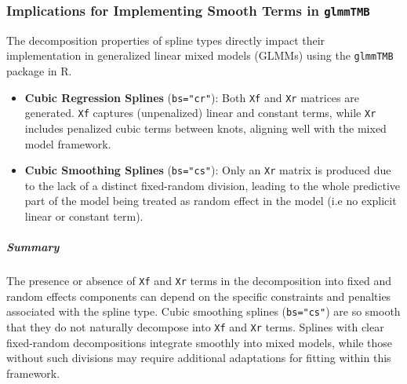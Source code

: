\documentclass[12pt, twoside,hidelinks]{article}
\theoremstyle{definition}
\numberwithin{equation}{section}
\begin{document}
\subsubsection{Implications for Implementing Smooth Terms in \texttt{glmmTMB}}

The decomposition properties of spline types directly impact their implementation in generalized linear mixed models (GLMMs) using the \texttt{glmmTMB} package in R.

\begin{itemize}
    \item \textbf{Cubic Regression Splines} (\texttt{bs="cr"}): Both \texttt{Xf} and \texttt{Xr} matrices are generated. \texttt{Xf} captures (unpenalized) linear and constant terms, while \texttt{Xr} includes penalized cubic terms between knots, aligning well with the mixed model framework.
    \item \textbf{Cubic Smoothing Splines} (\texttt{bs="cs"}): Only an \texttt{Xr} matrix is produced due to the lack of a distinct fixed-random division, leading to the whole predictive part of the model being treated as random effect in the model (i.e no explicit linear or constant term).
\end{itemize}

\subparagraph{Summary}

The presence or absence of \texttt{Xf} and \texttt{Xr} terms in the decomposition into fixed and random effects components can depend on the specific constraints and penalties associated with the spline type. Cubic smoothing splines (\texttt{bs="cs"}) are so smooth that they do not naturally decompose into \texttt{Xf} and \texttt{Xr} terms. Splines with clear fixed-random decompositions integrate smoothly into mixed models, while those without such divisions may require additional adaptations for fitting within this framework. 
\end{document}
